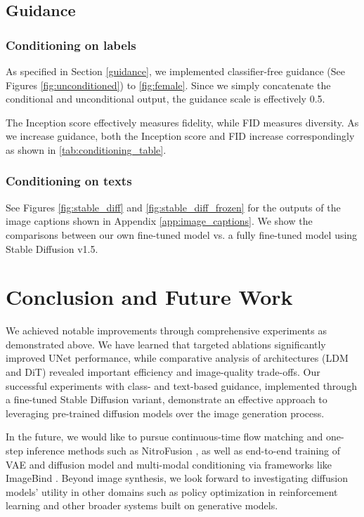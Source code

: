 \documentclass[conference]{IEEEtran}
\begin{document}
\subsection{Guidance}\label{e_guidance}

\subsubsection{Conditioning on labels}

As specified in Section \ref{guidance}, we implemented classifier-free guidance (See Figures \ref{fig:unconditioned}) to \ref{fig:female}. Since we simply concatenate the conditional and unconditional output, the guidance scale is effectively 0.5.

The Inception score effectively measures fidelity, while FID measures diversity. As we increase guidance, both the Inception score and FID increase correspondingly as shown in \ref{tab:conditioning_table}.


\subsubsection{Conditioning on texts}

See Figures \ref{fig:stable_diff} and \ref{fig:stable_diff_frozen} for the outputs of the image captions shown in Appendix \ref{app:image_captions}. We show the comparisons between our own fine-tuned model vs. a fully fine-tuned model using Stable Diffusion v1.5.

\section{Conclusion and Future Work}\label{conclusion}

We achieved notable improvements through comprehensive experiments as demonstrated above. We have learned that targeted ablations significantly improved UNet performance, while comparative analysis of architectures (LDM and DiT) revealed important efficiency and image-quality trade-offs. Our successful experiments with class- and text-based guidance, implemented through a fine-tuned Stable Diffusion variant, demonstrate an effective approach to leveraging pre-trained diffusion models over the image generation process.

In the future, we would like to pursue continuous-time flow matching and one-step inference methods such as NitroFusion \cite{chenNitroFusionHighFidelitySingleStep2024}, as well as end-to-end training of VAE and diffusion model \cite{lengREPAEUnlockingVAE2025} and multi-modal conditioning via frameworks like ImageBind \cite{girdharImageBindOneEmbedding2023}. Beyond image synthesis, we look forward to investigating diffusion models’ utility in other domains such as policy optimization in reinforcement learning \cite{chiDiffusionPolicyVisuomotor2024} and other broader systems built on generative models.
\end{document}
